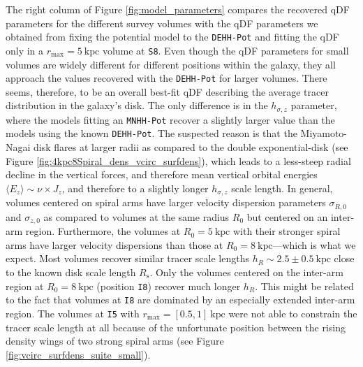\documentclass[iop,revtex4,numberedappendix,appendixfloats]{emulateapj}
\begin{document}
The right column of Figure \ref{fig:model_parameters} compares the recovered qDF parameters for the different survey volumes with the qDF parameters we obtained from fixing the potential model to the \texttt{DEHH-Pot} and fitting the qDF only in a $r_\text{max}=5~\text{kpc}$ volume at \texttt{S8}. Even though the qDF parameters for small volumes are widely different for different positions within the galaxy, they all approach the values recovered with the \texttt{DEHH-Pot} for larger volumes. There seems, therefore, to be an overall best-fit qDF describing the average tracer distribution in the galaxy's disk. The only difference is in the $h_{\sigma,z}$ parameter, where the models fitting an \texttt{MNHH-Pot} recover a slightly larger value than the models using the known \texttt{DEHH-Pot}. The suspected reason is that the Miyamoto-Nagai disk flares at larger radii as compared to the double exponential-disk (see Figure \ref{fig:4kpc8Spiral_dens_vcirc_surfdens}), which leads to a less-steep radial decline in the vertical forces, and therefore mean vertical orbital energies $\langle E_z \rangle \sim \nu \times J_z$, and therefore to a slightly longer $h_{\sigma,z}$ scale length. In general, volumes centered on spiral arms have larger velocity dispersion parameters $\sigma_{R,0}$ and $\sigma_{z,0}$ as compared to volumes at the same radius $R_0$ but centered on an inter-arm region. Furthermore, the volumes at $R_0=5~\text{kpc}$ with their stronger spiral arms have larger velocity dispersions than those at $R_0=8~\text{kpc}$---which is what we expect. Most volumes recover similar tracer scale lengths $h_R\sim2.5\pm0.5~\text{kpc}$ close to the known disk scale length $R_\text{s}$. Only the volumes centered on the inter-arm region at $R_0=8~\text{kpc}$ (position \texttt{I8}) recover much longer $h_R$. This might be related to the fact that volumes at \texttt{I8} are dominated by an especially extended inter-arm region. The volumes at \texttt{I5} with $r_\text{max}=[0.5,1]~\text{kpc}$ were not able to constrain the tracer scale length at all because of the unfortunate position between the rising density wings of two strong spiral arms (see Figure \ref{fig:vcirc_surfdens_suite_small}).
\end{document}
